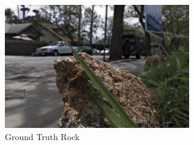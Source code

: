 \documentclass[10pt,twocolumn,letterpaper]{article}
\begin{document}
\begin{figure}[h]
\begin{center}
\caption{Ground Truth Rock}
\includegraphics[width=8cm]{rock/truth_05_05.png}
\end{center}
\end{figure}


\pagebreak

{\small


}
\end{document}
